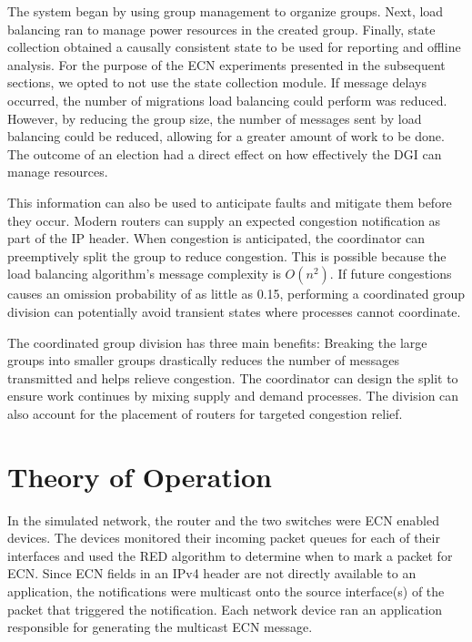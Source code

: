The system began by using group management to organize groups.
Next, load balancing ran to manage power resources in the created group.
Finally, state collection obtained a causally consistent state to be used for reporting and offline analysis.
For the purpose of the ECN experiments presented in the subsequent sections, we opted to not use the state collection module.
If message delays occurred, the number of migrations load balancing could perform was reduced.
However, by reducing the group size, the number of messages sent by load balancing could be reduced, allowing for a greater amount of work to be done.
The outcome of an election had a direct effect on how effectively the DGI can manage resources.

This information can also be used to anticipate faults and mitigate them before they occur.
Modern routers can supply an expected congestion notification as part of the IP header\cite{ECN2}.
When congestion is anticipated, the coordinator can preemptively split the group to reduce congestion.
This is possible because the load balancing algorithm's message complexity is $O(n^2)$.
If future congestions causes an omission probability of as little as 0.15, performing a coordinated group division can potentially avoid transient states where processes cannot coordinate.

The coordinated group division has three main benefits:
Breaking the large groups into smaller groups drastically reduces the number of messages transmitted and helps relieve congestion.
The coordinator can design the split to ensure work continues by mixing supply and demand processes.
The division can also account for the placement of routers for targeted congestion relief.

\section{Theory of Operation}

In the simulated network, the router and the two switches were ECN enabled devices.
The devices monitored their incoming packet queues for each of their interfaces and used the \ac{RED} algorithm to determine when to mark a packet for \ac{ECN}.
Since \ac{ECN} fields in an IPv4 header are not directly available to an application, the notifications were multicast onto the source interface(s) of the packet that triggered the notification.
Each network device ran an application responsible for generating the multicast ECN message.

